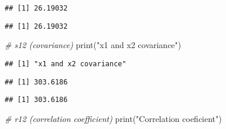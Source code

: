 \documentclass[
]{article}
\newenvironment{Shaded}{\begin{snugshade}}{\end{snugshade}}
\newcommand{\CommentTok}[1]{\textcolor[rgb]{0.56,0.35,0.01}{\textit{#1}}}
\newcommand{\FunctionTok}[1]{\textcolor[rgb]{0.00,0.00,0.00}{#1}}
\newcommand{\NormalTok}[1]{#1}
\newcommand{\SpecialCharTok}[1]{\textcolor[rgb]{0.00,0.00,0.00}{#1}}
\newcommand{\StringTok}[1]{\textcolor[rgb]{0.31,0.60,0.02}{#1}}
\begin{document}
\begin{verbatim}
## [1] 26.19032
\end{verbatim}

\begin{Shaded}
\end{Shaded}

\begin{verbatim}
## [1] 26.19032
\end{verbatim}

\begin{Shaded}
\begin{Highlighting}[]
\CommentTok{\# s12 (covariance)}
\FunctionTok{print}\NormalTok{(}\StringTok{"x1 and x2 covariance"}\NormalTok{)}
\end{Highlighting}
\end{Shaded}

\begin{verbatim}
## [1] "x1 and x2 covariance"
\end{verbatim}

\begin{Shaded}
\end{Shaded}

\begin{verbatim}
## [1] 303.6186
\end{verbatim}

\begin{Shaded}
\end{Shaded}

\begin{verbatim}
## [1] 303.6186
\end{verbatim}

\begin{Shaded}
\begin{Highlighting}[]
\CommentTok{\# r12 (correlation coefficient)}
\FunctionTok{print}\NormalTok{(}\StringTok{"Correlation coeficient"}\NormalTok{)}
\end{Highlighting}
\end{Shaded}
\end{document}
